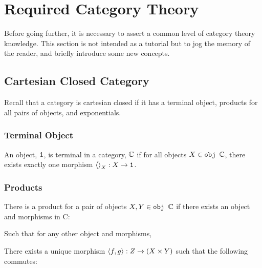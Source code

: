 \documentclass{Report}
\begin{document}
\chapter{Required Category Theory}\label{CategoryTheoryRequirements}

Before going further, it is necessary to assert a common level of category theory knowledge. This section is not intended as a tutorial but to jog the memory of the reader, and briefly introduce some new concepts.

\section{Cartesian Closed Category}\label{CCC}

Recall that a category is cartesian closed if it has a terminal object, products for all pairs of objects, and exponentials.

\subsection{Terminal Object}
An object, $\texttt{1}$, is terminal in a category, $\mathbb{C}$ if for all objects $X\in\texttt{obj }\mathbb{C}$, there exists exactly one morphism $\left\langle\right\rangle_{X}: X \rightarrow \texttt{1}$.

\subsection{Products}
There is a product for a pair of objects $X, Y\in\texttt{obj }\mathbb{C}$ if there exists an object and morphisms in C:

Such that for any other object and morphisms,


There exists a unique morphism $\left\langle f, g\right\rangle: Z \rightarrow (X\times Y)$ such that the following commutes:

\end{document}
